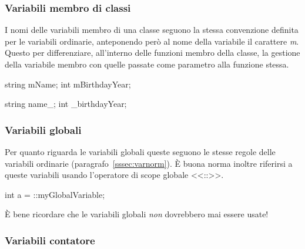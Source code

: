 \subsubsection{Variabili membro di classi}

I nomi delle variabili membro di una classe seguono la stessa convenzione definita per le variabili ordinarie, anteponendo però al nome della variabile il carattere \emph{m}.
Questo per differenziare, all'interno delle funzioni membro della classe, la gestione della variabile membro con quelle passate come parametro alla funzione stessa.

\begin{minipage}[t]{\cbwidth}
\begin{RightCode}
string mName;
int mBirthdayYear;
\end{RightCode}
\end{minipage}%
\hspace{\cbdistance}
\begin{minipage}[t]{\cbwidth}
\begin{ErrorCode}
string name_;
int _birthdayYear;
\end{ErrorCode}
\end{minipage}

\subsubsection{Variabili globali}

Per quanto riguarda le variabili globali queste seguono le stesse regole delle variabili ordinarie (paragrafo~\ref{sssec:varnorm}).
È buona norma inoltre riferirsi a queste variabili usando l'operatore di scope globale <<::>>\cite{codestyle:geotechnical}.

\begin{minipage}[t]{\rbwidth}
\begin{RightCode}
int a = ::myGlobalVariable;
\end{RightCode}
\end{minipage}

È bene ricordare che le variabili globali \emph{non} dovrebbero mai essere usate!

\subsubsection{Variabili contatore}

